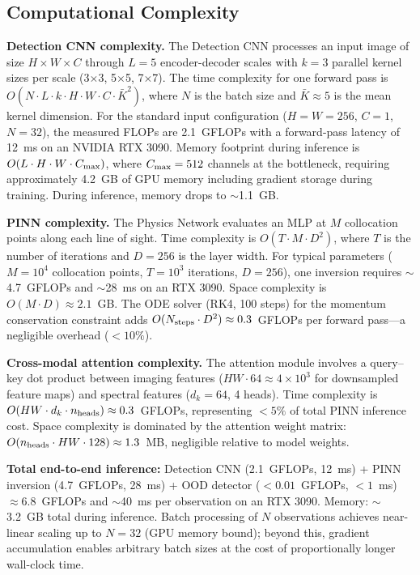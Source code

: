 \documentclass[usenatbib]{mnras}
\begin{document}
\subsection{Computational Complexity}\label{sec:complexity}

\textbf{Detection CNN complexity.} The Detection CNN processes an input image of size $H \times W \times C$ through $L = 5$ encoder-decoder scales with $k = 3$ parallel kernel sizes per scale (3$\times$3, 5$\times$5, 7$\times$7). The time complexity for one forward pass is $O(N \cdot L \cdot k \cdot H \cdot W \cdot C \cdot \bar{K}^2)$, where $N$ is the batch size and $\bar{K} \approx 5$ is the mean kernel dimension. For the standard input configuration ($H=W=256$, $C=1$, $N=32$), the measured FLOPs are 2.1~GFLOPs with a forward-pass latency of 12~ms on an NVIDIA RTX 3090. Memory footprint during inference is $O(L \cdot H \cdot W \cdot C_{\rm max})$, where $C_{\rm max}=512$ channels at the bottleneck, requiring approximately 4.2~GB of GPU memory including gradient storage during training. During inference, memory drops to $\sim$1.1~GB.

\textbf{PINN complexity.} The Physics Network evaluates an MLP at $M$ collocation points along each line of sight. Time complexity is $O(T \cdot M \cdot D^2)$, where $T$ is the number of iterations and $D=256$ is the layer width. For typical parameters ($M=10^4$ collocation points, $T=10^3$ iterations, $D=256$), one inversion requires $\sim$4.7~GFLOPs and $\sim$28~ms on an RTX 3090. Space complexity is $O(M \cdot D) \approx 2.1$~GB. The ODE solver (RK4, 100 steps) for the momentum conservation constraint adds $O(N_{\rm steps} \cdot D^2) \approx 0.3$~GFLOPs per forward pass---a negligible overhead ($<10\%$).

\textbf{Cross-modal attention complexity.} The attention module involves a query--key dot product between imaging features ($HW \cdot 64 \approx 4 \times 10^3$ for downsampled feature maps) and spectral features ($d_k=64$, 4 heads). Time complexity is $O(HW \cdot d_k \cdot n_{\rm heads}) \approx 0.3$~GFLOPs, representing $<5\%$ of total PINN inference cost. Space complexity is dominated by the attention weight matrix: $O(n_{\rm heads} \cdot HW \cdot 128) \approx 1.3$~MB, negligible relative to model weights.

\textbf{Total end-to-end inference:} Detection CNN (2.1~GFLOPs, 12~ms) + PINN inversion (4.7~GFLOPs, 28~ms) + OOD detector ($<0.01$~GFLOPs, $<1$~ms) $\approx 6.8$~GFLOPs and $\sim$40~ms per observation on an RTX 3090. Memory: $\sim$3.2~GB total during inference. Batch processing of $N$ observations achieves near-linear scaling up to $N=32$ (GPU memory bound); beyond this, gradient accumulation enables arbitrary batch sizes at the cost of proportionally longer wall-clock time.
\end{document}
